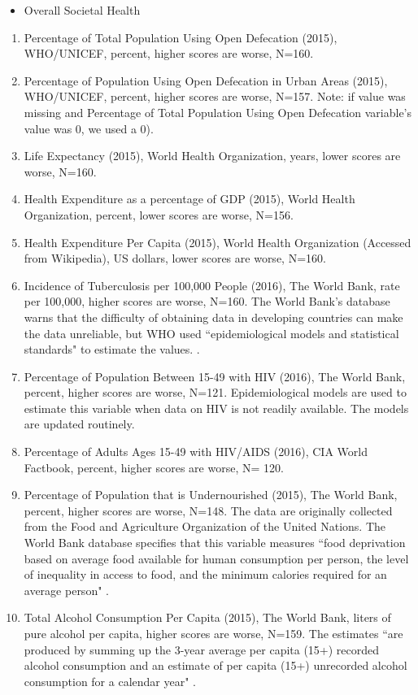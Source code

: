 \begin{itemize}
    \item Overall Societal Health
\end{itemize}
\begin{enumerate}
\item	Percentage of Total Population Using Open Defecation (2015), WHO/UNICEF, percent, higher scores are worse, N=160. 
\item Percentage of Population Using Open Defecation in Urban Areas (2015), WHO/UNICEF, percent, higher scores are worse, N=157. Note: if value was missing and Percentage of Total Population Using Open Defecation variable’s value was 0, we used a 0). 
\item Life Expectancy (2015), World Health Organization, years, lower scores are worse, N=160. 
\item Health Expenditure as a percentage of GDP (2015), World Health Organization, percent, lower scores are worse, N=156. 
\item Health Expenditure Per Capita (2015), World Health Organization (Accessed from Wikipedia), US dollars, lower scores are worse, N=160. 
\item Incidence of Tuberculosis per 100,000 People (2016), The World Bank, rate per 100,000, higher scores are worse, N=160. The World Bank's database warns that the difficulty of obtaining data in developing countries can make the data unreliable, but WHO used ``epidemiological models and statistical standards" to estimate the values. \citep{wbopen}.
\item Percentage of Population Between 15-49 with HIV (2016), The World Bank, percent, higher scores are worse, N=121. Epidemiological models are used to estimate this variable when data on HIV is not readily available. The models are updated routinely. 
\item Percentage of Adults Ages 15-49 with HIV/AIDS (2016), CIA World Factbook, percent, higher scores are worse, N= 120. 
\item Percentage of Population that is Undernourished (2015), The World Bank, percent, higher scores are worse, N=148. The data are originally collected from the Food and Agriculture Organization of the United Nations. The World Bank database specifies that this variable measures ``food deprivation based on average food available for human consumption per person, the level of inequality in access to food, and the minimum calories required for an average person" \citep{wbopen}.
\item Total Alcohol Consumption Per Capita (2015), The World Bank, liters of pure alcohol per capita, higher scores are worse, N=159. The estimates ``are produced by summing up the 3-year average per capita (15+) recorded alcohol consumption and an estimate of per capita (15+) unrecorded alcohol consumption for a calendar year" \citep{wbopen}.

\end{enumerate}
